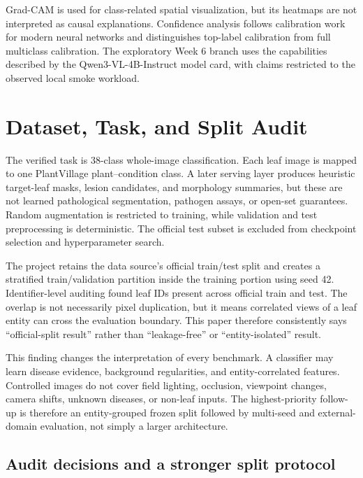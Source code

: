 \documentclass[11pt]{article}
\begin{document}
Grad-CAM is used for class-related spatial visualization\cite{selvaraju2017gradcam}, but its heatmaps are not interpreted as causal explanations. Confidence analysis follows calibration work for modern neural networks\cite{guo2017calibration} and distinguishes top-label calibration from full multiclass calibration. The exploratory Week 6 branch uses the capabilities described by the Qwen3-VL-4B-Instruct model card\cite{qwen3vl2025modelcard}, with claims restricted to the observed local smoke workload.

\section{Dataset, Task, and Split Audit}

The verified task is 38-class whole-image classification. Each leaf image is mapped to one PlantVillage plant--condition class. A later serving layer produces heuristic target-leaf masks, lesion candidates, and morphology summaries, but these are not learned pathological segmentation, pathogen assays, or open-set guarantees. Random augmentation is restricted to training, while validation and test preprocessing is deterministic. The official test subset is excluded from checkpoint selection and hyperparameter search.

The project retains the data source's official train/test split and creates a stratified train/validation partition inside the training portion using seed 42. Identifier-level auditing found \PDAOfficialOverlap{} leaf IDs present across official train and test. The overlap is not necessarily pixel duplication, but it means correlated views of a leaf entity can cross the evaluation boundary. This paper therefore consistently says ``official-split result'' rather than ``leakage-free'' or ``entity-isolated'' result.

This finding changes the interpretation of every benchmark. A classifier may learn disease evidence, background regularities, and entity-correlated features. Controlled images do not cover field lighting, occlusion, viewpoint changes, camera shifts, unknown diseases, or non-leaf inputs. The highest-priority follow-up is therefore an entity-grouped frozen split followed by multi-seed and external-domain evaluation, not simply a larger architecture.

\subsection*{Audit decisions and a stronger split protocol}
\end{document}
